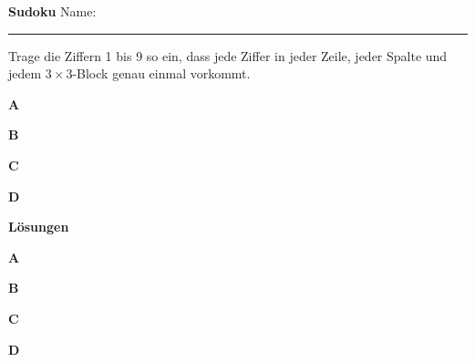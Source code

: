 \documentclass[11pt,a4paper]{article}
\renewcommand*\sudokuformat[1]{\LARGE\sffamily#1}
\begin{document}
{\Large\bfseries\sffamily Sudoku} \hfill Name: \rule{5cm}{0.4pt}

\smallskip
Trage die Ziffern 1 bis 9 so ein, dass jede Ziffer in jeder Zeile, jeder
Spalte und jedem $3\times3$-Block genau einmal vorkommt.

\bigskip
\begin{minipage}[t]{0.49\textwidth}\centering\textbf{A}\SudokuAufgabeA\end{minipage}\hfill
\begin{minipage}[t]{0.49\textwidth}\centering\textbf{B}\SudokuAufgabeB\end{minipage}

\bigskip
\begin{minipage}[t]{0.49\textwidth}\centering\textbf{C}\SudokuAufgabeC\end{minipage}\hfill
\begin{minipage}[t]{0.49\textwidth}\centering\textbf{D}\SudokuAufgabeD\end{minipage}

\newpage
{\Large\bfseries\sffamily Lösungen}

\bigskip
\setlength\sudokusize{6cm}
\renewcommand*\sudokuformat[1]{\large\sffamily#1}
\begin{minipage}[t]{0.49\textwidth}\centering\textbf{A}\SudokuLoesungA\end{minipage}\hfill
\begin{minipage}[t]{0.49\textwidth}\centering\textbf{B}\SudokuLoesungB\end{minipage}

\bigskip
\begin{minipage}[t]{0.49\textwidth}\centering\textbf{C}\SudokuLoesungC\end{minipage}\hfill
\begin{minipage}[t]{0.49\textwidth}\centering\textbf{D}\SudokuLoesungD\end{minipage}
\end{document}
